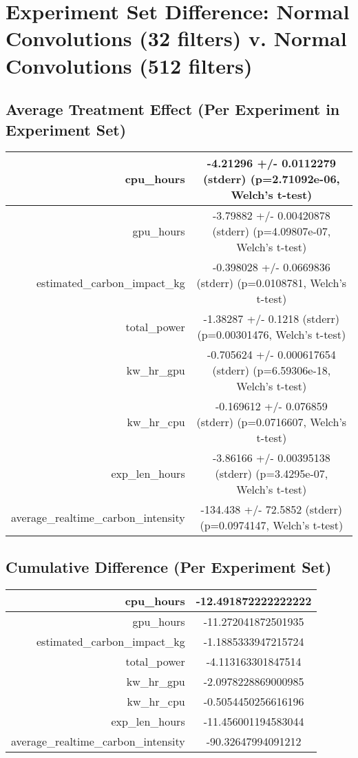 \documentclass{article}%
\begin{document}
%
\normalsize%
\section{Experiment Set Difference: Normal Convolutions (32 filters) v. Normal Convolutions (512 filters)}%
\label{sec:Experiment Set Difference Normal Convolutions (32 filters) v. Normal Convolutions (512 filters)}%
\subsection{Average Treatment Effect (Per Experiment in Experiment Set)}%
\label{subsec:Average Treatment Effect (Per Experiment in Experiment Set)}%
\begin{tabular}{|r|c|}%
\hline%
cpu\_hours&{-}4.21296 +/{-} 0.0112279 (stderr) (p=2.71092e{-}06, Welch's t{-}test)\\%
\hline%
gpu\_hours&{-}3.79882 +/{-} 0.00420878 (stderr) (p=4.09807e{-}07, Welch's t{-}test)\\%
\hline%
estimated\_carbon\_impact\_kg&{-}0.398028 +/{-} 0.0669836 (stderr) (p=0.0108781, Welch's t{-}test)\\%
\hline%
total\_power&{-}1.38287 +/{-} 0.1218 (stderr) (p=0.00301476, Welch's t{-}test)\\%
\hline%
kw\_hr\_gpu&{-}0.705624 +/{-} 0.000617654 (stderr) (p=6.59306e{-}18, Welch's t{-}test)\\%
\hline%
kw\_hr\_cpu&{-}0.169612 +/{-} 0.076859 (stderr) (p=0.0716607, Welch's t{-}test)\\%
\hline%
exp\_len\_hours&{-}3.86166 +/{-} 0.00395138 (stderr) (p=3.4295e{-}07, Welch's t{-}test)\\%
\hline%
average\_realtime\_carbon\_intensity&{-}134.438 +/{-} 72.5852 (stderr) (p=0.0974147, Welch's t{-}test)\\%
\hline%
\end{tabular}

%
\subsection{Cumulative Difference (Per Experiment Set)}%
\label{subsec:Cumulative Difference (Per Experiment Set)}%
\begin{tabular}{|r|c|}%
\hline%
cpu\_hours&{-}12.491872222222222\\%
\hline%
gpu\_hours&{-}11.272041872501935\\%
\hline%
estimated\_carbon\_impact\_kg&{-}1.1885333947215724\\%
\hline%
total\_power&{-}4.113163301847514\\%
\hline%
kw\_hr\_gpu&{-}2.0978228869000985\\%
\hline%
kw\_hr\_cpu&{-}0.5054450256616196\\%
\hline%
exp\_len\_hours&{-}11.456001194583044\\%
\hline%
average\_realtime\_carbon\_intensity&{-}90.32647994091212\\%
\hline%
\end{tabular}

%
\end{document}
